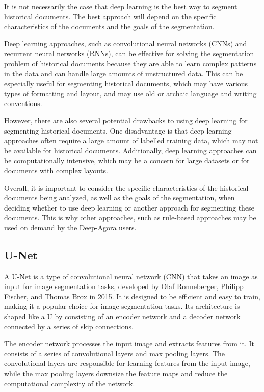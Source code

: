 \documentclass{polytech/polytech}
\numberwithin{figure}{chapter}
\begin{document}
It is not necessarily the case that deep learning is the best way to segment historical documents.
The best approach will depend on the specific characteristics of the documents and the goals of the segmentation.

Deep learning approaches, such as convolutional neural networks (CNNs) and recurrent neural networks (RNNs), can be effective for solving the segmentation problem of historical documents because they are able to learn complex patterns in the data and can handle large amounts of unstructured data.
This can be especially useful for segmenting historical documents, which may have various types of formatting and layout, and may use old or archaic language and writing conventions.

However, there are also several potential drawbacks to using deep learning for segmenting historical documents.
One disadvantage is that deep learning approaches often require a large amount of labelled training data, which may not be available for historical documents.
Additionally, deep learning approaches can be computationally intensive, which may be a concern for large datasets or for documents with complex layouts.

Overall, it is important to consider the specific characteristics of the historical documents being analyzed, as well as the goals of the segmentation, when deciding whether to use deep learning or another approach for segmenting these documents.
This is why other approaches, such as rule-based approaches may be used on demand by the Deep-Agora users.


\subsection{U-Net}

A U-Net is a type of convolutional neural network (CNN) that takes an image as input for image segmentation tasks, developed by Olaf Ronneberger, Philipp Fischer, and Thomas Brox in 2015.
It is designed to be efficient and easy to train, making it a popular choice for image segmentation tasks.
Its architecture is shaped like a U by consisting of an encoder network and a decoder network connected by a series of skip connections.

The encoder network processes the input image and extracts features from it.
It consists of a series of convolutional layers and max pooling layers.
The convolutional layers are responsible for learning features from the input image, while the max pooling layers downsize the feature maps and reduce the computational complexity of the network.
\end{document}
